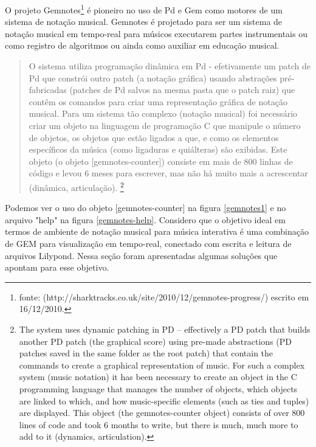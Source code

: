 \documentclass{ppgmus}
\begin{document}
O projeto Gemnotes\footnote{fonte: (http://sharktracks.co.uk/site/2010/12/gemnotes-progress/) escrito em 16/12/2010.} 
\cite{gemnotes} é pioneiro no uso de Pd e Gem como motores de um sistema de notação musical.
Gemnotes é projetado para ser um sistema de notação musical em tempo-real para músicos executarem partes instrumentais
ou como registro de algoritmos ou ainda como auxiliar em educação musical.

\begin{quote}
O sistema utiliza programação dinâmica em Pd - efetivamente um patch de Pd que constrói outro patch (a notação gráfica)
usando abstrações pré-fabricadas (patches de Pd salvos na mesma pasta que o patch raiz) que contêm os comandos para
criar uma representação gráfica de notação musical. Para um sistema tão complexo (notação musical) foi necessário
criar um objeto na linguagem de programação C que manipule o número de objetos, os objetos que estão ligados a que,
e como os elementos específicos da música (como ligaduras e quiálteras) são exibidas. Este objeto (o objeto [gemnotes-counter])
consiste em mais de 800 linhas de código e levou 6 meses para escrever, mas não há muito mais a acrescentar
(dinâmica, articulação). \cite{gemnotes} \footnote{The system uses dynamic patching in PD – effectively a PD patch that builds another PD patch (the graphical score) 
using pre-made abstractions (PD patches saved in the same folder as the root patch) that contain the commands to 
create a graphical representation of music. For such a complex system (music notation) it has been necessary to 
create an object in the C programming language that manages the number of objects, which objects are linked to which, 
and how music-specific elements (such as ties and tuples) are displayed. This object (the gemnotes-counter object) 
consists of over 800 lines of code and took 6 months to write, but there is much, much more to add to it 
(dynamics, articulation).}
\end{quote}


Podemos ver o uso do objeto [gemnotes-counter] na figura \ref{gemnotes1} e no arquivo "help" na figura \ref{gemnotes-help}.
Considero que o objetivo ideal em termos de ambiente de notação musical para música interativa é uma combinação de GEM para
visualização em tempo-real, conectado com escrita e leitura de arquivos Lilypond. Nessa seção foram apresentadas algumas
soluções que apontam para esse objetivo.
\end{document}
